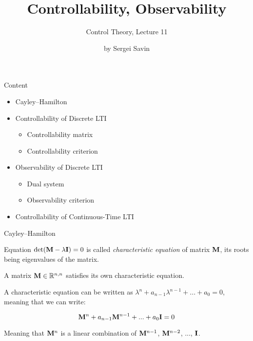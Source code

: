 \documentclass{beamer}
\title{Controllability, Observability}
\subtitle{Control Theory, Lecture 11}
\author{by Sergei Savin}
\date{\mydate}
\begin{document}
\maketitle


\begin{frame}{Content}
\begin{itemize}
\item Cayley–Hamilton
\item Controllability of Discrete LTI
\begin{itemize}
    \item Controllability matrix
    \item Controllability criterion
\end{itemize}
\item Observability of Discrete LTI
\begin{itemize}
    \item Dual system
    \item Observability criterion
\end{itemize}
\item Controllability of Continuous-Time LTI
\end{itemize}
\end{frame}





\begin{frame}{Cayley–Hamilton}
	\begin{flushleft}
		
		Equation $\text{det}(\mathbf{M} - \lambda\mathbf{I}) = 0$ is called \emph{characteristic equation} of matrix $\mathbf{M}$, its roots being eigenvalues of the matrix.
		
		\bigskip
		
		\begin{theorem}
			A matrix $\mathbf{M} \in \mathbb{R}^{n, n}$ satisfies its own characteristic equation.
		\end{theorem}
		
		A characteristic equation can be written as $\lambda^n + a_{n-1}\lambda^{n-1} + ... + a_0  = 0$, meaning that we can write:
		
		\begin{equation}
			\mathbf{M}^n + a_{n-1}\mathbf{M}^{n-1} + ... + a_0\mathbf{I}  = 0
		\end{equation}	
		
		Meaning that \textcolor{mydarkblue}{$\mathbf{M}^n$ is a linear combination of $\mathbf{M}^{n-1}$, $\mathbf{M}^{n-2}$, ..., $\mathbf{I}$}.
		
		
	\end{flushleft}
\end{frame}
\end{document}
